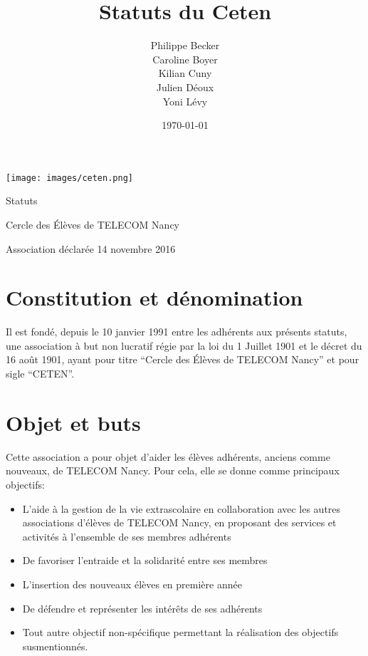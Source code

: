 \documentclass{article}
\title{Statuts du Ceten}
\author{Philippe Becker\\
	Caroline Boyer\\
	Kilian Cuny\\
	Julien Déoux\\
	Yoni Lévy} %
\date\today
\begin{document}

	
	\begin{titlepage}
		\begin{center}
			\texttt{[image: images/ceten.png]}\par
			\vspace{3cm}
			{\Huge\light{} Statuts}\par
			\vfill
			{\large Cercle des Élèves de TELECOM Nancy}\par
			{\large\light{} Association déclarée}
			\vfill
			{\light{} 14 novembre 2016}\par
		\end{center}
	\end{titlepage}

	



	\section{Constitution et dénomination}
\label{sec:consitution_et_denomination}
		Il est fondé, depuis le 10 janvier 1991 entre les adhérents aux présents
		statuts, une association à but non lucratif régie par la loi du 1
		Juillet 1901 et le décret du 16 août 1901, ayant pour titre “Cercle des
		Élèves de TELECOM Nancy” et pour sigle “CETEN”.

	\section{Objet et buts}
\label{sec:objet_et_buts}
		Cette association a pour objet d’aider les élèves adhérents, anciens
		comme nouveaux, de TELECOM Nancy. Pour cela, elle se donne comme
		principaux objectifs:
		\begin{itemize}
			\item L’aide à la gestion de la vie extrascolaire en collaboration
				avec les autres associations d'élèves de TELECOM Nancy, en
				proposant des services et activités à l’ensemble de ses membres
				adhérents
			\item De favoriser l’entraide et la solidarité entre ses membres
			\item L’insertion des nouveaux élèves en première année
			\item De défendre et représenter les intérêts de ses adhérents
			\item Tout autre objectif non-spécifique permettant la réalisation
				des objectifs susmentionnés.
		\end{itemize}
\end{document}
